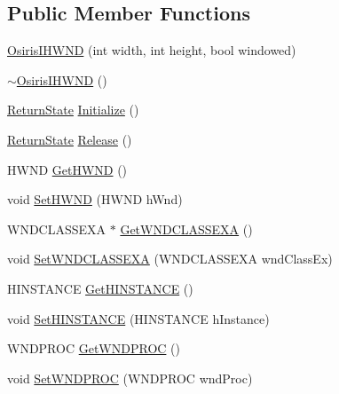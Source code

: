 \subsection*{Public Member Functions}
\begin{DoxyCompactItemize}
\item 
\hyperlink{class_osiris_i_1_1_graphics_1_1_devices_1_1_osiris_i_h_w_n_d_afc80e14840b5f91f7489fca580b78145}{Osiris\-I\-H\-W\-N\-D} (int width, int height, bool windowed)
\item 
\hyperlink{class_osiris_i_1_1_graphics_1_1_devices_1_1_osiris_i_h_w_n_d_a3fe4d0785fd5caedeac6fe2d3049c05a}{$\sim$\-Osiris\-I\-H\-W\-N\-D} ()
\item 
\hyperlink{namespace_osiris_i_a8f53bf938dc75c65c6a529694514013e}{Return\-State} \hyperlink{class_osiris_i_1_1_graphics_1_1_devices_1_1_osiris_i_h_w_n_d_a4e1718dc06e4a7f49399dd6a989d0499}{Initialize} ()
\item 
\hyperlink{namespace_osiris_i_a8f53bf938dc75c65c6a529694514013e}{Return\-State} \hyperlink{class_osiris_i_1_1_graphics_1_1_devices_1_1_osiris_i_h_w_n_d_ae35d9bd4ad7f0ccf0d41960e82e5d57c}{Release} ()
\item 
H\-W\-N\-D \hyperlink{class_osiris_i_1_1_graphics_1_1_devices_1_1_osiris_i_h_w_n_d_a3f2400eb1d2a1c8e78dfd53e45addf47}{Get\-H\-W\-N\-D} ()
\item 
void \hyperlink{class_osiris_i_1_1_graphics_1_1_devices_1_1_osiris_i_h_w_n_d_a4dbeffb9e6c0d1d59e9fe46929f8d278}{Set\-H\-W\-N\-D} (H\-W\-N\-D h\-Wnd)
\item 
W\-N\-D\-C\-L\-A\-S\-S\-E\-X\-A $\ast$ \hyperlink{class_osiris_i_1_1_graphics_1_1_devices_1_1_osiris_i_h_w_n_d_a1a8d61733b2ac5d584a531432a30f543}{Get\-W\-N\-D\-C\-L\-A\-S\-S\-E\-X\-A} ()
\item 
void \hyperlink{class_osiris_i_1_1_graphics_1_1_devices_1_1_osiris_i_h_w_n_d_a3e2ca4a5fe2c5d4d375d1bc72c295045}{Set\-W\-N\-D\-C\-L\-A\-S\-S\-E\-X\-A} (W\-N\-D\-C\-L\-A\-S\-S\-E\-X\-A wnd\-Class\-Ex)
\item 
H\-I\-N\-S\-T\-A\-N\-C\-E \hyperlink{class_osiris_i_1_1_graphics_1_1_devices_1_1_osiris_i_h_w_n_d_a8619b778ad5790da19640226c4dbbf22}{Get\-H\-I\-N\-S\-T\-A\-N\-C\-E} ()
\item 
void \hyperlink{class_osiris_i_1_1_graphics_1_1_devices_1_1_osiris_i_h_w_n_d_ac4d595067c0d21100a2aa8a7994bc8a9}{Set\-H\-I\-N\-S\-T\-A\-N\-C\-E} (H\-I\-N\-S\-T\-A\-N\-C\-E h\-Instance)
\item 
W\-N\-D\-P\-R\-O\-C \hyperlink{class_osiris_i_1_1_graphics_1_1_devices_1_1_osiris_i_h_w_n_d_aba5a5ad03a6bd3f7360778309b9c8f38}{Get\-W\-N\-D\-P\-R\-O\-C} ()
\item 
void \hyperlink{class_osiris_i_1_1_graphics_1_1_devices_1_1_osiris_i_h_w_n_d_ae955cf0720254545f211fbc00a774549}{Set\-W\-N\-D\-P\-R\-O\-C} (W\-N\-D\-P\-R\-O\-C wnd\-Proc)
\end{DoxyCompactItemize}



